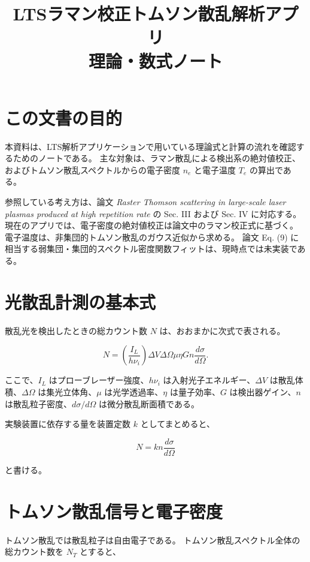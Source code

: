 \documentclass[11pt]{ltjsarticle}
\title{LTSラマン校正トムソン散乱解析アプリ\\理論・数式ノート}
\author{}
\date{}
\begin{document}
\maketitle

\section{この文書の目的}

本資料は、LTS解析アプリケーションで用いている理論式と計算の流れを確認するためのノートである。
主な対象は、ラマン散乱による検出系の絶対値校正、およびトムソン散乱スペクトルからの電子密度 $n_e$ と電子温度 $T_e$ の算出である。

参照している考え方は、論文 \textit{Raster Thomson scattering in large-scale laser plasmas produced at high repetition rate} の Sec. III および Sec. IV に対応する。
現在のアプリでは、電子密度の絶対値校正は論文中のラマン校正式に基づく。
電子温度は、非集団的トムソン散乱のガウス近似から求める。
論文 Eq. (9) に相当する弱集団・集団的スペクトル密度関数フィットは、現時点では未実装である。

\section{光散乱計測の基本式}

散乱光を検出したときの総カウント数 $N$ は、おおまかに次式で表される。

\begin{equation}
N
=
\left(\frac{I_L}{h\nu_i}\right)
\Delta V
\Delta\Omega
\mu
\eta
G
n
\frac{d\sigma}{d\Omega}.
\end{equation}

ここで、$I_L$ はプローブレーザー強度、$h\nu_i$ は入射光子エネルギー、$\Delta V$ は散乱体積、$\Delta\Omega$ は集光立体角、$\mu$ は光学透過率、$\eta$ は量子効率、$G$ は検出器ゲイン、$n$ は散乱粒子密度、$d\sigma/d\Omega$ は微分散乱断面積である。

実験装置に依存する量を装置定数 $k$ としてまとめると、

\begin{equation}
N = k n \frac{d\sigma}{d\Omega}
\end{equation}

と書ける。

\section{トムソン散乱信号と電子密度}

トムソン散乱では散乱粒子は自由電子である。
トムソン散乱スペクトル全体の総カウント数を $N_T$ とすると、
\end{document}
